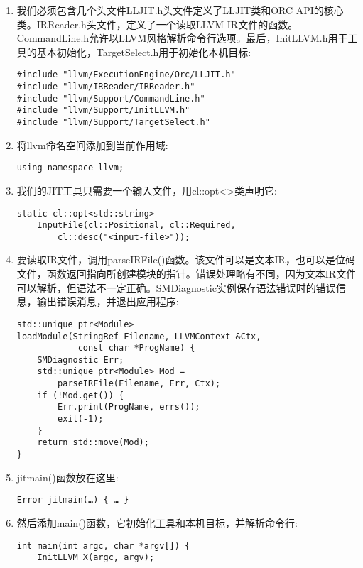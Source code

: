 \begin{enumerate}
\item 我们必须包含几个头文件LLJIT.h头文件定义了LLJIT类和ORC API的核心类。IRReader.h头文件，定义了一个读取LLVM IR文件的函数。CommandLine.h允许以LLVM风格解析命令行选项。最后，InitLLVM.h用于工具的基本初始化，TargetSelect.h用于初始化本机目标:
\begin{lstlisting}[caption={}]
#include "llvm/ExecutionEngine/Orc/LLJIT.h"
#include "llvm/IRReader/IRReader.h"
#include "llvm/Support/CommandLine.h"
#include "llvm/Support/InitLLVM.h"
#include "llvm/Support/TargetSelect.h"
\end{lstlisting}

\item 将llvm命名空间添加到当前作用域:
\begin{lstlisting}[caption={}]
using namespace llvm;
\end{lstlisting}

\item 我们的JIT工具只需要一个输入文件，用cl::opt<>类声明它:
\begin{lstlisting}[caption={}]
static cl::opt<std::string>
	InputFile(cl::Positional, cl::Required,
		cl::desc("<input-file>"));
\end{lstlisting}

\item 要读取IR文件，调用parseIRFile()函数。该文件可以是文本IR，也可以是位码文件，函数返回指向所创建模块的指针。错误处理略有不同，因为文本IR文件可以解析，但语法不一定正确。SMDiagnostic实例保存语法错误时的错误信息，输出错误消息，并退出应用程序:
\begin{lstlisting}[caption={}]
std::unique_ptr<Module>
loadModule(StringRef Filename, LLVMContext &Ctx,
			const char *ProgName) {
	SMDiagnostic Err;
	std::unique_ptr<Module> Mod =
		parseIRFile(Filename, Err, Ctx);
	if (!Mod.get()) {
		Err.print(ProgName, errs());
		exit(-1);
	}
	return std::move(Mod);
}
\end{lstlisting}

\item jitmain()函数放在这里:
\begin{lstlisting}[caption={}]
Error jitmain(…) { … }
\end{lstlisting}

\item 然后添加main()函数，它初始化工具和本机目标，并解析命令行:
\begin{lstlisting}[caption={}]
int main(int argc, char *argv[]) {
	InitLLVM X(argc, argv);
	

\end{lstlisting}
\end{enumerate}
